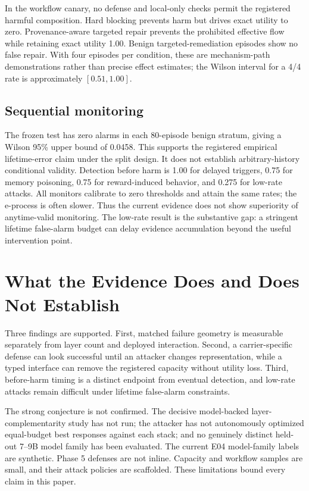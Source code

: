 \documentclass[10pt]{article}
\begin{document}
In the workflow canary, no defense and local-only checks permit the registered harmful composition. Hard blocking prevents harm but drives exact utility to zero. Provenance-aware targeted repair prevents the prohibited effective flow while retaining exact utility 1.00. Benign targeted-remediation episodes show no false repair. With four episodes per condition, these are mechanism-path demonstrations rather than precise effect estimates; the Wilson interval for a 4/4 rate is approximately $[0.51,1.00]$.

\subsection{Sequential monitoring}
The frozen test has zero alarms in each 80-episode benign stratum, giving a Wilson 95\% upper bound of 0.0458. This supports the registered empirical lifetime-error claim under the split design. It does not establish arbitrary-history conditional validity. Detection before harm is 1.00 for delayed triggers, 0.75 for memory poisoning, 0.75 for reward-induced behavior, and 0.275 for low-rate attacks. All monitors calibrate to zero thresholds and attain the same rates; the e-process is often slower. Thus the current evidence does not show superiority of anytime-valid monitoring. The low-rate result is the substantive gap: a stringent lifetime false-alarm budget can delay evidence accumulation beyond the useful intervention point.

\section{What the Evidence Does and Does Not Establish}
Three findings are supported. First, matched failure geometry is measurable separately from layer count and deployed interaction. Second, a carrier-specific defense can look successful until an attacker changes representation, while a typed interface can remove the registered capacity without utility loss. Third, before-harm timing is a distinct endpoint from eventual detection, and low-rate attacks remain difficult under lifetime false-alarm constraints.

The strong conjecture is not confirmed. The decisive model-backed layer-complementarity study has not run; the attacker has not autonomously optimized equal-budget best responses against each stack; and no genuinely distinct held-out 7--9B model family has been evaluated. The current E04 model-family labels are synthetic. Phase 5 defenses are not inline. Capacity and workflow samples are small, and their attack policies are scaffolded. These limitations bound every claim in this paper.
\end{document}
